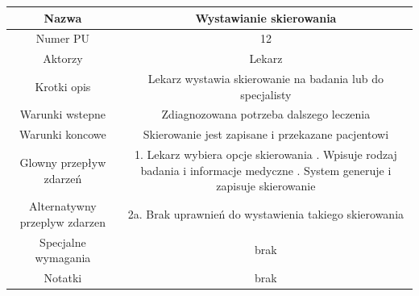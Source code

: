\documentclass{article}
\begin{document}
\vspace{1cm}

\noindent
\begin{tabular}{|c|c|}%
        \hline
        Nazwa & Wystawianie skierowania \\
        \hline
        Numer PU & 12\\
        \hline
        Aktorzy & Lekarz\\
        \hline
        Krotki opis & Lekarz wystawia skierowanie na badania lub do specjalisty\\
        \hline
        Warunki wstepne & Zdiagnozowana potrzeba dalszego leczenia\\
        \hline
        Warunki koncowe & Skierowanie jest zapisane i przekazane pacjentowi\\
        \hline
        Glowny przepływ zdarzeń & 1. Lekarz wybiera opcje skierowania \newline
                                 2. Wpisuje rodzaj badania i informacje medyczne \newline
                                 3. System generuje i zapisuje skierowanie  \\
        \hline
        Alternatywny przeplyw zdarzen &  2a. Brak uprawnień do wystawienia takiego skierowania\\
        \hline
        Specjalne wymagania & brak\\
        \hline
        Notatki& brak\\
        \hline
\end{tabular}
\end{document}
